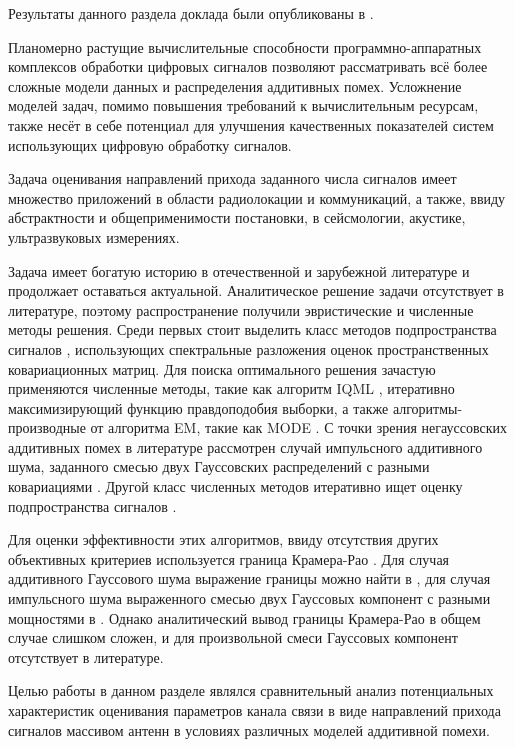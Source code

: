 Результаты данного раздела доклада были опубликованы в \cite{vakbib1}.

Планомерно растущие вычислительные способности программно-аппаратных комплексов обработки цифровых сигналов позволяют рассматривать всё более сложные модели данных и распределения аддитивных помех. Усложнение моделей задач, помимо повышения требований к вычислительным ресурсам, также несёт в себе потенциал для улучшения качественных показателей систем использующих цифровую обработку сигналов.

Задача оценивания направлений прихода заданного числа сигналов имеет множество приложений в области радиолокации и коммуникаций, а также, ввиду абстрактности и общеприменимости постановки, в сейсмологии, акустике, ультразвуковых измерениях. 

Задача имеет богатую историю в отечественной \cite{TrifShin1986, ManGel2015} и зарубежной \cite{Capon1969} литературе и продолжает оставаться актуальной. Аналитическое решение задачи отсутствует в литературе, поэтому распространение получили эвристические и численные методы решения. Среди первых стоит выделить класс методов подпространства сигналов \cite{Schmidt1986, Roy1989}, использующих спектральные разложения оценок пространственных ковариационных матриц. Для поиска оптимального решения зачастую применяются численные методы, такие как алгоритм IQML \cite{Bresler1985, Bresler1986}, итеративно максимизирующий функцию правдоподобия выборки, а также алгоритмы-производные от алгоритма EM, такие как MODE \cite{Stoica1990}. С точки зрения негауссовских аддитивных помех в литературе рассмотрен случай импульсного аддитивного шума, заданного смесью двух Гауссовских распределений с разными ковариациями \cite{Kozick2000, Kozick2000b}. Другой класс численных методов итеративно ищет оценку подпространства сигналов \cite{Ziskind1988, Bazzi2018}.

Для оценки эффективности этих алгоритмов, ввиду отсутствия других объективных критериев используется граница Крамера-Рао \cite{Cramer1993, KayS.1993}. Для случая аддитивного Гауссового шума выражение границы можно найти в \cite{Stoica1988, Stoica1989a, Stoica1989, Stoica1990a}, для случая импульсного шума выраженного смесью двух Гауссовых компонент с разными мощностями в \cite{Kozick2000, Kozick2000b, Kalyani2012}. Однако аналитический вывод границы Крамера-Рао в общем случае слишком сложен, и для произвольной смеси Гауссовых компонент отсутствует в литературе.

Целью работы в данном разделе являлся сравнительный анализ потенциальных характеристик оценивания параметров канала связи в виде направлений прихода сигналов массивом антенн в условиях различных моделей аддитивной помехи.


